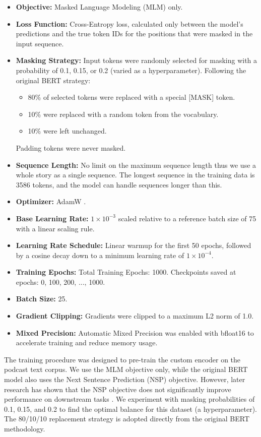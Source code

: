 \documentclass[10pt,letterpaper]{article}
\begin{document}
\begin{itemize}
    \item \textbf{Objective:} Masked Language Modeling (MLM) only.
    \item \textbf{Loss Function:} Cross-Entropy loss, calculated only between the model's predictions and the true token IDs for the positions that were masked in the input sequence.
    \item \textbf{Masking Strategy:} Input tokens were randomly selected for masking with a probability of 0.1, 0.15, or 0.2 (varied as a hyperparameter). Following the original BERT strategy:
    \begin{itemize}
        \item 80\% of selected tokens were replaced with a special [MASK] token.
        \item 10\% were replaced with a random token from the vocabulary.
        \item 10\% were left unchanged.
    \end{itemize}
    Padding tokens were never masked.
    \item \textbf{Sequence Length:} No limit on the maximum sequence length thus we use a whole story as a single sequence. The longest sequence in the training data is 3586 tokens, and the model can handle sequences longer than this.
    \item \textbf{Optimizer:} AdamW \cite{loshchilov2017decoupled}.
    \item \textbf{Base Learning Rate:} \(1 \times 10^{-3}\) scaled relative to a reference batch size of 75 with a linear scaling rule.
    \item \textbf{Learning Rate Schedule:} Linear warmup for the first 50 epochs, followed by a cosine decay down to a minimum learning rate of \(1 \times 10^{-4}\).
    \item \textbf{Training Epochs:} Total Training Epochs: 1000. Checkpoints saved at epochs: 0, 100, 200, ..., 1000.
    \item \textbf{Batch Size:} 25.
    \item \textbf{Gradient Clipping:} Gradients were clipped to a maximum L2 norm of 1.0.
    \item \textbf{Mixed Precision:} Automatic Mixed Precision was enabled with bfloat16 to accelerate training and reduce memory usage.
\end{itemize}

The training procedure was designed to pre-train the custom encoder on the podcast text corpus. We use the MLM objective only, while the original BERT model also uses the Next Sentence Prediction (NSP) objective. However, later research has shown that the NSP objective does not significantly improve performance on downstream tasks \cite{liu2019roberta}. We experiment with masking probabilities of 0.1, 0.15, and 0.2 to find the optimal balance for this dataset (a hyperparameter). The 80/10/10 replacement strategy is adopted directly from the original BERT methodology.
\end{document}
